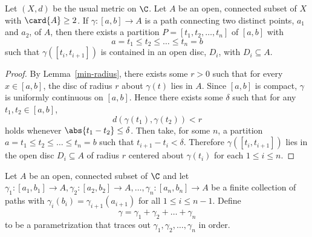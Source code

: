 \documentclass[12pt]{amsart}
\begin{document}
\begin{lem}\label{partition}
  Let $(X,d)$ be the usual metric on $\C$.  Let $A$ be an open, connected subset of $X$ with $\card{A} \geq 2$.
  If $\gamma \colon [a, b] \rightarrow A$ is a path connecting two distinct points, $a_1$ and $a_2$, of $A$, then there exists a partition $P = [t_1, t_2, \ldots, t_n]$ of $[a,b]$ with
  $$a = t_1 \leq t_2 \leq \ldots \leq t_n = b$$
  such that $\gamma([t_i, t_{i+1}])$ is contained in an open disc, $D_i$, with $D_i \subseteq A$.
  \begin{proof}
    By Lemma~\ref{min-radius}, there exists some $r > 0$ such that for every $x \in [a,b]$, the disc of radius $r$ about $\gamma(t)$ lies in $A$.
    Since $[a,b]$ is compact, $\gamma$ is uniformly continuous on $[a,b]$.
    Hence there exists some $\delta$ such that for any $t_1, t_2 \in [a,b]$, $$d(\gamma(t_1),\gamma(t_2)) < r$$ holds whenever $\abs{t_1 - t_2} \leq \delta$.
    Then take, for some $n$, a partition $a = t_1 \leq t_2 \leq \ldots \leq t_n = b$ such that $t_{i+1} - t_i < \delta$.
    Therefore $\gamma([t_i, t_{i+1}])$ lies in the open disc $D_i \subseteq A$ of radius $r$ centered about $\gamma(t_i)$ for each $1 \leq i \leq n$.
  \end{proof}
\end{lem}

\begin{defn}
  Let $A$ be an open, connected subset of $\C$ and let $\gamma_1 \colon [a_1,b_1] \rightarrow A, \gamma_2 \colon [a_2,b_2] \rightarrow A, \ldots, \gamma_n \colon [a_n,b_n] \rightarrow A$ be a finite collection of paths with $\gamma_i(b_i) = \gamma_{i+1}(a_{i+1})$ for all $1 \leq i \leq n-1$.
  Define $$\gamma = \gamma_1 + \gamma_2 + \ldots + \gamma_n$$ to be a parametrization that traces out $\gamma_1, \gamma_2, \ldots, \gamma_n$ in order.
\end{defn}
\end{document}
